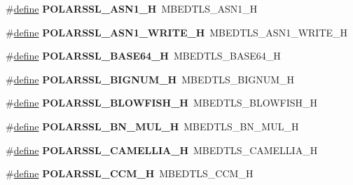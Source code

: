 \begin{DoxyCompactItemize}
\item 
\mbox{\label{compat-1_83_8h_a6c3a88efcf8d960e20fc37639e5088f7}} 
\#\hyperlink{structdefine}{define} {\bfseries P\+O\+L\+A\+R\+S\+S\+L\+\_\+\+A\+S\+N1\+\_\+H}~M\+B\+E\+D\+T\+L\+S\+\_\+\+A\+S\+N1\+\_\+H
\item 
\mbox{\label{compat-1_83_8h_a7cde479565f8697d80d44d054e78e300}} 
\#\hyperlink{structdefine}{define} {\bfseries P\+O\+L\+A\+R\+S\+S\+L\+\_\+\+A\+S\+N1\+\_\+\+W\+R\+I\+T\+E\+\_\+H}~M\+B\+E\+D\+T\+L\+S\+\_\+\+A\+S\+N1\+\_\+\+W\+R\+I\+T\+E\+\_\+H
\item 
\mbox{\label{compat-1_83_8h_a70e36b97d27417b6e4ab091924523d4d}} 
\#\hyperlink{structdefine}{define} {\bfseries P\+O\+L\+A\+R\+S\+S\+L\+\_\+\+B\+A\+S\+E64\+\_\+H}~M\+B\+E\+D\+T\+L\+S\+\_\+\+B\+A\+S\+E64\+\_\+H
\item 
\mbox{\label{compat-1_83_8h_ae38cf0588c907362f273873868ea188b}} 
\#\hyperlink{structdefine}{define} {\bfseries P\+O\+L\+A\+R\+S\+S\+L\+\_\+\+B\+I\+G\+N\+U\+M\+\_\+H}~M\+B\+E\+D\+T\+L\+S\+\_\+\+B\+I\+G\+N\+U\+M\+\_\+H
\item 
\mbox{\label{compat-1_83_8h_aa9b72f11cc690354bd7f5a07bd25e715}} 
\#\hyperlink{structdefine}{define} {\bfseries P\+O\+L\+A\+R\+S\+S\+L\+\_\+\+B\+L\+O\+W\+F\+I\+S\+H\+\_\+H}~M\+B\+E\+D\+T\+L\+S\+\_\+\+B\+L\+O\+W\+F\+I\+S\+H\+\_\+H
\item 
\mbox{\label{compat-1_83_8h_a6a1b84a13e14f6c1bc294fc8a45a216e}} 
\#\hyperlink{structdefine}{define} {\bfseries P\+O\+L\+A\+R\+S\+S\+L\+\_\+\+B\+N\+\_\+\+M\+U\+L\+\_\+H}~M\+B\+E\+D\+T\+L\+S\+\_\+\+B\+N\+\_\+\+M\+U\+L\+\_\+H
\item 
\mbox{\label{compat-1_83_8h_ab547d35267ea1dfdc323e85d0ba24c1c}} 
\#\hyperlink{structdefine}{define} {\bfseries P\+O\+L\+A\+R\+S\+S\+L\+\_\+\+C\+A\+M\+E\+L\+L\+I\+A\+\_\+H}~M\+B\+E\+D\+T\+L\+S\+\_\+\+C\+A\+M\+E\+L\+L\+I\+A\+\_\+H
\item 
\mbox{\label{compat-1_83_8h_ae23c797b950ad08ddbc9a6461c34b01d}} 
\#\hyperlink{structdefine}{define} {\bfseries P\+O\+L\+A\+R\+S\+S\+L\+\_\+\+C\+C\+M\+\_\+H}~M\+B\+E\+D\+T\+L\+S\+\_\+\+C\+C\+M\+\_\+H

\end{DoxyCompactItemize}
